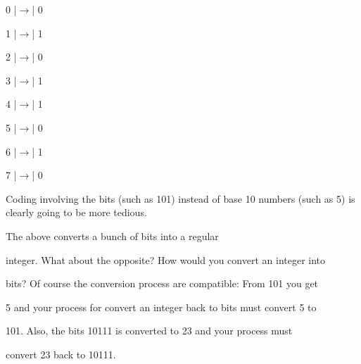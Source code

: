 \begin{consolethree}[escapeinside=||]

0 |$\rightarrow$| 0



1 |$\rightarrow$| 1



2 |$\rightarrow$| 0



3 |$\rightarrow$| 1



4 |$\rightarrow$| 1



5 |$\rightarrow$| 0



6 |$\rightarrow$| 1



7 |$\rightarrow$| 0

\end{consolethree}



Coding involving the bits (such as 101) instead of base 10 numbers (such as 5) is clearly going to be more tedious.



The above converts a bunch of bits into a regular

integer. What about the opposite? How would you convert an integer into

bits? Of course the conversion process are compatible: From 101 you get

5 and your process for convert an integer back to bits must convert 5 to

101. Also, the bits 10111 is converted to 23 and your process must

convert 23 back to 10111.

